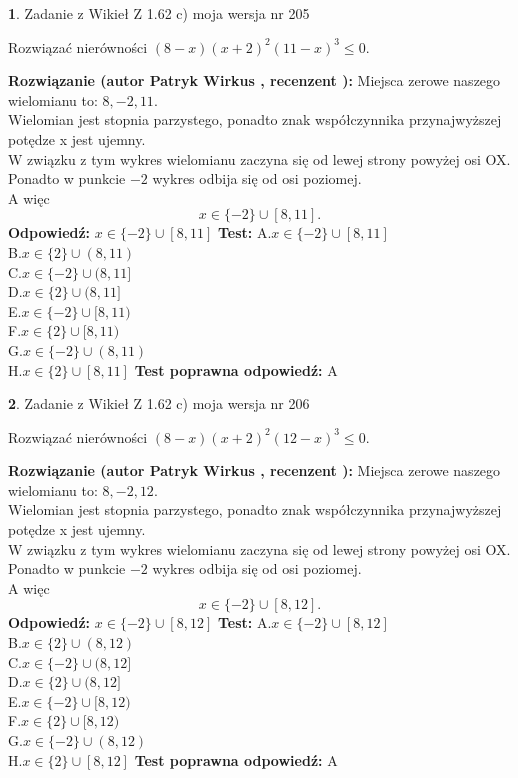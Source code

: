 \documentclass[12pt, a4paper]{article}
\theoremstyle{definition} %
\newtheorem{zad}{}
\newcommand{\zadStart}[1]{\begin{zad}#1\newline}
\newcommand{\zadStop}{\end{zad}}
\newcommand{\rozwStart}[2]{\noindent \textbf{Rozwiązanie (autor #1 , recenzent #2): }\newline}
\newcommand{\rozwStop}{\newline}
\newcommand{\odpStart}{\noindent \textbf{Odpowiedź:}\newline}
\newcommand{\odpStop}{\newline}
\newcommand{\testStart}{\noindent \textbf{Test:}\newline}
\newcommand{\testStop}{\newline}
\newcommand{\kluczStart}{\noindent \textbf{Test poprawna odpowiedź:}\newline}
\newcommand{\kluczStop}{\newline}
\begin{document}
\zadStart{Zadanie z Wikieł Z 1.62 c) moja wersja nr 205}

Rozwiązać nierówności $(8-x)(x+2)^{2}(11-x)^{3}\le0$.
\zadStop
\rozwStart{Patryk Wirkus}{}
Miejsca zerowe naszego wielomianu to: $8, -2, 11$.\\
Wielomian jest stopnia parzystego, ponadto znak współczynnika przy\linebreak najwyższej potędze x jest ujemny.\\ W związku z tym wykres wielomianu zaczyna się od lewej strony powyżej osi OX.\\
Ponadto w punkcie $-2$ wykres odbija się od osi poziomej.\\
A więc $$x \in \{-2\} \cup [8,11].$$
\rozwStop
\odpStart
$x \in \{-2\} \cup [8,11]$
\odpStop
\testStart
A.$x \in \{-2\} \cup [8,11]$\\
B.$x \in \{2\} \cup (8,11)$\\
C.$x \in \{-2\} \cup (8,11]$\\
D.$x \in \{2\} \cup (8,11]$\\
E.$x \in \{-2\} \cup [8,11)$\\
F.$x \in \{2\} \cup [8,11)$\\
G.$x \in \{-2\} \cup (8,11)$\\
H.$x \in \{2\} \cup [8,11]$
\testStop
\kluczStart
A
\kluczStop



\zadStart{Zadanie z Wikieł Z 1.62 c) moja wersja nr 206}

Rozwiązać nierówności $(8-x)(x+2)^{2}(12-x)^{3}\le0$.
\zadStop
\rozwStart{Patryk Wirkus}{}
Miejsca zerowe naszego wielomianu to: $8, -2, 12$.\\
Wielomian jest stopnia parzystego, ponadto znak współczynnika przy\linebreak najwyższej potędze x jest ujemny.\\ W związku z tym wykres wielomianu zaczyna się od lewej strony powyżej osi OX.\\
Ponadto w punkcie $-2$ wykres odbija się od osi poziomej.\\
A więc $$x \in \{-2\} \cup [8,12].$$
\rozwStop
\odpStart
$x \in \{-2\} \cup [8,12]$
\odpStop
\testStart
A.$x \in \{-2\} \cup [8,12]$\\
B.$x \in \{2\} \cup (8,12)$\\
C.$x \in \{-2\} \cup (8,12]$\\
D.$x \in \{2\} \cup (8,12]$\\
E.$x \in \{-2\} \cup [8,12)$\\
F.$x \in \{2\} \cup [8,12)$\\
G.$x \in \{-2\} \cup (8,12)$\\
H.$x \in \{2\} \cup [8,12]$
\testStop
\kluczStart
A
\kluczStop
\end{document}
